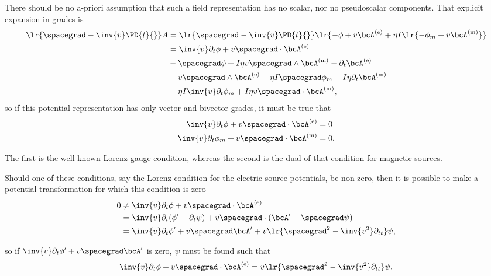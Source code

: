 There should be no a-priori assumption that such a field representation has no scalar, nor no pseudoscalar components.  That explicit expansion in grades is
\begin{equation}\label{eqn:potentialMethods:1640}
\begin{aligned}
\lr{ \spacegrad - \inv{v} \PD{t}{} } A
&=
\lr{ \spacegrad - \inv{v} \PD{t}{} } \lr{ -\phi + v \bcA^\e + \eta I \lr{ -\phi_m + v \bcA^\m } } \\
&=
\inv{v} \partial_t \phi
+ v \spacegrad \cdot \bcA^\e  \\
&-\spacegrad \phi
+ I \eta v \spacegrad \wedge \bcA^\m
- \partial_t \bcA^\e  \\
&+ v \spacegrad \wedge \bcA^\e
- \eta I \spacegrad \phi_m
- I \eta \partial_t \bcA^\m \\
&+ \eta I \inv{v} \partial_t \phi_m
+ I \eta v \spacegrad \cdot \bcA^\m,
\end{aligned}
\end{equation}
so if this potential representation has only vector and bivector grades, it must be true that
\begin{equation}\label{eqn:potentialMethods:1660}
\begin{aligned}
\inv{v} \partial_t \phi + v \spacegrad \cdot \bcA^\e &= 0 \\
\inv{v} \partial_t \phi_m + v \spacegrad \cdot \bcA^\m &= 0.
\end{aligned}
\end{equation}

The first is the well known Lorenz gauge condition, whereas the second is the dual of that condition for magnetic sources.

Should one of these conditions, say the Lorenz condition for the electric source potentials, be non-zero, then it is possible to make a potential transformation for which this condition is zero
\begin{equation}\label{eqn:potentialMethods:1680}
\begin{aligned}
0 
&\ne \inv{v} \partial_t \phi + v \spacegrad \cdot \bcA^\e \\
&= \inv{v} \partial_t (\phi' - \partial_t \psi) + v \spacegrad \cdot (\bcA' + \spacegrad \psi) \\
&= \inv{v} \partial_t \phi' + v \spacegrad \bcA' + v \lr{ \spacegrad^2 - \inv{v^2} \partial_{tt} } \psi,
\end{aligned}
\end{equation}

so if \( \inv{v} \partial_t \phi' + v \spacegrad \bcA' \) is zero, \( \psi \) must be found such that
\begin{equation}\label{eqn:potentialMethods:1700}
\inv{v} \partial_t \phi + v \spacegrad \cdot \bcA^\e
= v \lr{ \spacegrad^2 - \inv{v^2} \partial_{tt} } \psi.
\end{equation}
